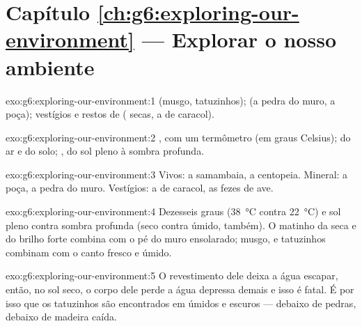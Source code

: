 \section*{Capítulo \ref{ch:g6:exploring-our-environment} --- Explorar o nosso ambiente}

\begin{solution}{exo:g6:exploring-our-environment:1}
 (musgo, tatuzinhos);  (a pedra do muro, a
poça); vestígios e restos de  ( secas, a  de
caracol).
\end{solution}

\begin{solution}{exo:g6:exploring-our-environment:2}
, com um termômetro (em graus Celsius);  do ar e
do solo; , do sol pleno à sombra profunda.
\end{solution}

\begin{solution}{exo:g6:exploring-our-environment:3}
Vivos: a samambaia, a centopeia. Mineral: a poça, a pedra do muro.
Vestígios: a  de caracol, as fezes de ave.
\end{solution}

\begin{solution}{exo:g6:exploring-our-environment:4}
Dezesseis graus (\qty{38}{\degreeCelsius} contra
\qty{22}{\degreeCelsius}) e sol pleno contra sombra profunda (seco
contra úmido, também). O matinho da seca e do brilho forte combina
com o pé do muro ensolarado; musgo,  e tatuzinhos combinam
com o canto fresco e úmido.
\end{solution}

\begin{solution}{exo:g6:exploring-our-environment:5}
O revestimento dele deixa a água escapar, então, no sol seco, o
corpo dele perde a água depressa demais e isso é fatal. É por isso
que os tatuzinhos são encontrados em  úmidos e escuros
--- debaixo de pedras, debaixo de madeira caída.
\end{solution}

